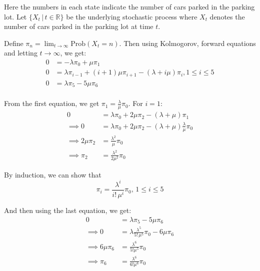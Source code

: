 \documentclass[12pt, oneside]{article}
\begin{document}
\begin{enumerate}
{

    Here the numbers in each state indicate the number of cars parked in the parking lot.
    Let \(\{X_t \,|\, t \in \mathbb{R}\}\) be the underlying stochastic process where \(X_t\)
    denotes the number of cars parked in the parking lot at time \(t\).

    Define \(\pi_n = \lim_{t \to \infty} \text{Prob}(X_t = n)\). Then using Kolmogorov, forward
    equations and letting \(t \to \infty\), we get:
    \begin{align*}
        0 &= -\lambda\pi_0 + \mu\pi_1 \\
        0 &= \lambda \pi_{i-1} + (i+1)\mu \pi_{i+1} - (\lambda + i \mu) \pi_i, 1 \leq i \leq 5 \\
        0 &= \lambda \pi_5 - 5\mu \pi_6 \\
    \end{align*}

    From the first equation, we get \(\pi_1 = \frac{\lambda}{\mu}\pi_0\).
    For \(i = 1\):
    \begin{align*}
        0 &= \lambda \pi_{0} + 2\mu \pi_{2} - (\lambda + \mu) \pi_1 \\
        \implies 0 &= \lambda \pi_{0} + 2\mu \pi_{2} - (\lambda + \mu) \frac{\lambda}{\mu}\pi_0 \\
        \implies 2\mu \pi_2 &= \frac{\lambda^2}{\mu} \pi_0 \\
        \implies \pi_2 &= \frac{\lambda^2}{2\mu^2} \pi_0
    \end{align*}

    By induction, we can show that
    \[\pi_i = \frac{\lambda^i}{i!\,\mu^i} \pi_0,\, 1 \leq i \leq 5\]

    And then using the last equation, we get:
    \begin{align*}
        0 &= \lambda \pi_5 - 5\mu \pi_6 \\
        \implies 0 &= \lambda \frac{\lambda^5}{5!\,\mu^5} \pi_0 - 6\mu \pi_6 \\
        \implies 6\mu \pi_6 &= \frac{\lambda^6}{5!\mu^5} \pi_0 \\
        \implies \pi_6 &= \frac{\lambda^6}{6!\mu^6} \pi_0
    \end{align*}

}
\end{enumerate}
\end{document}
